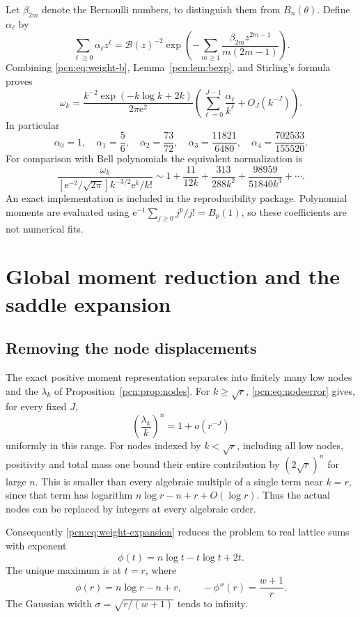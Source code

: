 \documentclass[11pt,letterpaper]{article}
\theoremstyle{remark}\newtheorem{remark}[theorem]{Remark}
\newcommand{\ee}{\mathrm e}
\begin{document}
Let $\beta_{2m}$ denote the Bernoulli numbers, to distinguish them from $B_n(\theta)$. Define $\alpha_\ell$ by
\begin{equation}\label{pcn:eq:alpha}
 \sum_{\ell\ge0}\alpha_\ell z^\ell
 =\mathcal B(z)^{-2}
   \exp\left(-\sum_{m\ge1}\frac{\beta_{2m}z^{2m-1}}{m(2m-1)}\right).
\end{equation}
Combining \eqref{pcn:eq:weight-b}, Lemma~\ref{pcn:lem:bexp}, and Stirling's formula proves
\begin{equation}\label{pcn:eq:weight-expansion}
 \omega_k=\frac{k^{-2}\exp(-k\log k+2k)}{2\pi\ee^2}
 \left(\sum_{\ell=0}^{J-1}\frac{\alpha_\ell}{k^\ell}+O_J(k^{-J})\right).
\end{equation}
In particular
\[
 \alpha_0=1,\quad \alpha_1=\frac56,\quad \alpha_2=\frac{73}{72},\quad
 \alpha_3=\frac{11821}{6480},\quad \alpha_4=\frac{702533}{155520}.
\]
For comparison with Bell polynomials the equivalent normalization is
\begin{equation}\label{pcn:eq:Dobinskiweight}
 \frac{\omega_k}{[\ee^{-2}/\sqrt{2\pi}]k^{-3/2}\ee^k/k!}
 \sim1+\frac{11}{12k}+\frac{313}{288k^2}
                         +\frac{98959}{51840k^3}+\cdots.
\end{equation}
An exact implementation is included in the reproducibility package. Polynomial moments are evaluated using $\ee^{-1}\sum_{j\ge0}j^p/j!=B_p(1)$, so these coefficients are not numerical fits.

\section{Global moment reduction and the saddle expansion}
\subsection{Removing the node displacements}
The exact positive moment representation separates into finitely many low nodes and the $\lambda_k$ of Proposition~\ref{pcn:prop:nodes}. For $k\ge\sqrt r$, \eqref{pcn:eq:nodeerror} gives, for every fixed $J$,
\[
 \left(\frac{\lambda_k}{k}\right)^n=1+o(r^{-J})
\]
uniformly in this range. For nodes indexed by $k<\sqrt r$, including all low nodes, positivity and total mass one bound their entire contribution by $(2\sqrt r)^n$ for large $n$. This is smaller than every algebraic multiple of a single term near $k=r$, since that term has logarithm $n\log r-n+r+O(\log r)$. Thus the actual nodes can be replaced by integers at every algebraic order.

Consequently \eqref{pcn:eq:weight-expansion} reduces the problem to real lattice sums with exponent
\begin{equation}\label{pcn:eq:phi}
 \phi(t)=n\log t-t\log t+2t.
\end{equation}
The unique maximum is at $t=r$, where
\[
 \phi(r)=n\log r-n+r,\qquad -\phi''(r)=\frac{w+1}{r}.
\]
The Gaussian width $\sigma=\sqrt{r/(w+1)}$ tends to infinity.
\end{document}

